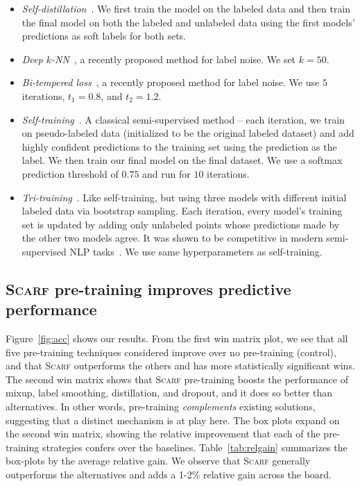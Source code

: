 \begin{itemize}
    \item \emph{Self-distillation}~\citep{hinton2015distilling,zhang2019your}. We first train the model on the labeled data and then train the final model on both the labeled and unlabeled data using the first models' predictions as soft labels for both sets.
    \item \emph{Deep $k$-NN}~\citep{bahri2020deep}, a recently proposed method for label noise. We set $k = 50$.
    \item \emph{Bi-tempered loss}~\citep{amid2019robust}, a recently proposed method for label noise. We use $5$ iterations, $t_1= 0.8$, and $t_2= 1.2$.
    \item \emph{Self-training}~\citep{yarowsky1995unsupervised,mcclosky2006effective}. A classical semi-supervised method -- each iteration, we train on pseudo-labeled data (initialized to be the original labeled dataset) and add highly confident predictions to the training set using the prediction as the label. We then train our final model on the final dataset. We use a softmax prediction threshold of $0.75$ and run for $10$ iterations.
    \item \emph{Tri-training}~\citep{zhou2005tri}. Like self-training, but using three models with different initial labeled data via bootstrap sampling. Each iteration, every model's training set is updated by adding only unlabeled points whose predictions made by the other two models agree. It was shown to be competitive in modern semi-supervised NLP tasks~\citep{ruder2018strong}. We use same hyperparameters as self-training.
\end{itemize}

\subsection{\textsc{Scarf} pre-training improves predictive performance}
Figure~\ref{fig:acc} shows our results. From the first win matrix plot, we see that all five pre-training techniques considered improve over no pre-training (control), and that \textsc{Scarf} outperforms the others and has more statistically significant wins. The second win matrix shows that \textsc{Scarf} pre-training boosts the performance of mixup, label smoothing, distillation, and dropout, and it does so better than alternatives. In other words, pre-training \emph{complements} existing solutions, suggesting that a distinct mechanism is at play here. The box plots expand on the second win matrix, showing the relative improvement that each of the pre-training strategies confers over the baselines. Table~\ref{tab:relgain} summarizes the box-plots by the average relative gain. We observe that \textsc{Scarf} generally outperforms the alternatives and adds a 1-2\% relative gain across the board.

